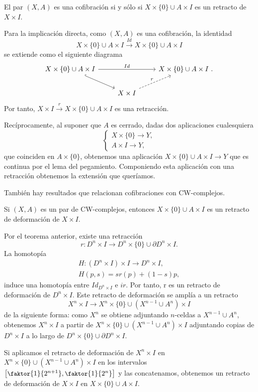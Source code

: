 \begin{teor}
El par $(X, A)$ es una cofibración si y sólo si $X \times \{0\} \cup A \times I$ es un retracto de $X \times I$.
\end{teor}
\begin{demo}
Para la implicación directa, como $(X,A)$ es una cofibración, la identidad 
\[ X \times \{0\} \cup A \times I \stackrel{Id}{\longrightarrow} X \times \{0\} \cup A \times I \]
se extiende como el siguiente diagrama
\[
\begin{tikzcd}
	X \times \{0\} \cup A \times I \arrow{rr}{Id} \drar[hook] & & X \times \{0\} \cup A \times I \ . \\
				& X \times I \urar[dashed]{r} &
\end{tikzcd}
\]
Por tanto, $X \times I \stackrel{r}{\longrightarrow} X \times \{0\} \cup A \times I$ es una retracción. \par
Recíprocamente, al suponer que $A$ es cerrado, dadas dos aplicaciones cualesquiera 
\[ \begin{cases}
X \times \{0\} \longrightarrow Y, \\
A \times I \longrightarrow Y,
\end{cases} \]
que coinciden en $A \times \{0\}$, obtenemos una aplicación $X \times \{0\} \cup A \times I \longrightarrow Y$ que es continua por el lema del pegamiento. Componiendo esta aplicación con una retracción obtenemos la extensión que queríamos.
\end{demo}
También hay resultados que relacionan cofibraciones con CW-complejos.
\begin{teor}
Si $(X, A)$ es un par de CW-complejos, entonces $X \times \{0\} \cup A \times I$ es un retracto de deformación de $X \times I$.
\end{teor}
\begin{demo}
Por el teorema anterior, existe una retracción 
\[r : D^n \times I \longrightarrow D^n \times \{0\} \cup \partial D^n \times I.\] 
La homotopía 
\begin{align*}
H : (D^n \times I) \times I \longrightarrow D^n \times I, \\
H(p, s) = s r(p) + (1-s)p,
\end{align*}
induce una homotopía entre $Id_{D^n \times I} $ e $ir$. Por tanto, r es un retracto de deformación de $D^n \times I$. 
Este retracto de deformación se amplía a un retracto 
\[X^n \times I \longrightarrow X^n \times \{0\} \cup (X^{n-1} \cup A^n) \times I \] de la siguiente forma: como $X^n$ se obtiene adjuntando $n$-celdas a $X^{n-1} \cup A^n$, obtenemos $X^n \times I$ a partir de $X^n \times \{0\} \cup (X^{n-1} \cup A^n) \times I$ adjuntando copias de $D^n \times I$ a lo largo de $D^n \times \{0\} \cup \partial D^n \times I$. \par 
Si aplicamos el retracto de deformación de $X^n \times I$ en $X^n \times \{0\} \cup (X^{n-1} \cup A^n) \times I$ en los intervalos ${\small \left[\faktor{1}{2^{n+1}}, \faktor{1}{2^n}\right]}$ y las concatenamos, obtenemos un retracto de deformación de $X \times I$ en $X \times \{0\} \cup A \times I$.
\end{demo}

